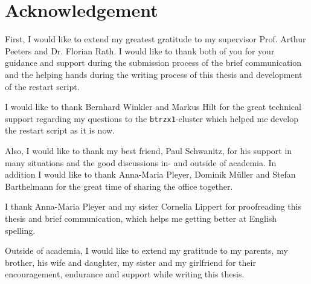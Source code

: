 \chapter*{Acknowledgement}
\label{chap:acknowledgement}

First, I would like to extend my greatest gratitude to my supervisor Prof. Arthur Peeters and Dr. Florian Rath. I would like to thank both of you for your guidance and support during the submission process of the brief communication and the helping hands during the writing process of this thesis and development of the restart script. \bigskip

I would like to thank Bernhard Winkler and Markus Hilt for the great technical support regarding my questions to the \texttt{btrzx1}-cluster which helped me develop the restart script as it is now. \bigskip

Also, I would like to thank my best friend, Paul Schwanitz, for his support in many situations and the good discussions in- and outside of academia. In addition I would like to thank Anna-Maria Pleyer, Dominik Müller and Stefan Barthelmann for the great time of sharing the office together. \bigskip

I thank Anna-Maria Pleyer and my sister Cornelia Lippert for proofreading this thesis and brief communication, which helps me getting better at English spelling. \bigskip

Outside of academia, I would like to extend my gratitude to my parents, my brother, his wife and daughter, my sister and my girlfriend for their encouragement, endurance and support while writing this thesis. 

